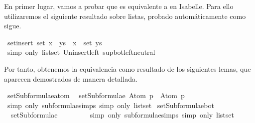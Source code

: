 \begin{isabellebody}
\begin{isamarkuptext}
  En primer lugar, vamos a probar que  es equivalente a  en
  Isabelle.
  Para ello utilizaremos el siguiente resultado sobre listas, probado automáticamente
  como sigue.%
\end{isamarkuptext}\isamarkuptrue%
\isamarkupfalse%
\ set{\isacharunderscore}insert{\isacharcolon}\ {\isachardoublequoteopen}set\ {\isacharparenleft}x\ {\isacharhash}\ ys{\isacharparenright}\ {\isacharequal}\ {\isacharbraceleft}x{\isacharbraceright}\ {\isasymunion}\ set\ ys{\isachardoublequoteclose}\isanewline
%
\isadelimproof
\ \ %
\endisadelimproof
%
\isatagproof
{}\isamarkupfalse%
\ {\isacharparenleft}simp\ only{\isacharcolon}\ list{\isachardot}set{\isacharparenleft}{}{\isacharparenright}\ Un{\isacharunderscore}insert{\isacharunderscore}left\ sup{\isacharunderscore}bot{\isachardot}left{\isacharunderscore}neutral{\isacharparenright}%
\endisatagproof
{\isafoldproof}%
%
\isadelimproof
%
\endisadelimproof
%
\begin{isamarkuptext}%
Por tanto, obtenemos la equivalencia como resultado de los siguientes lemas, que aparecen 
  demostrados de manera detallada.%
\end{isamarkuptext}\isamarkuptrue%
\isamarkupfalse%
\ setSubformulae{\isacharunderscore}atom{\isacharcolon}\isanewline
\ \ {\isachardoublequoteopen}setSubformulae\ {\isacharparenleft}Atom\ p{\isacharparenright}\ {\isacharequal}\ {\isacharbraceleft}Atom\ p{\isacharbraceright}{\isachardoublequoteclose}\isanewline
%
\isadelimproof
\ \ \ \ %
\endisadelimproof
%
\isatagproof
{}\isamarkupfalse%
\ {\isacharparenleft}simp\ only{\isacharcolon}\ subformulae{\isachardot}simps{\isacharparenleft}{}{\isacharparenright}{\isacharcomma}\ simp\ only{\isacharcolon}\ list{\isachardot}set{\isacharparenright}%
\endisatagproof
{\isafoldproof}%
%
\isadelimproof
\isanewline
%
\endisadelimproof
\isanewline
{}\isamarkupfalse%
\ setSubformulae{\isacharunderscore}bot{\isacharcolon}\isanewline
\ \ {\isachardoublequoteopen}setSubformulae\ {\isacharparenleft}{\isasymbottom}{\isacharparenright}\ {\isacharequal}\ {\isacharbraceleft}{\isasymbottom}{\isacharbraceright}{\isachardoublequoteclose}\isanewline
%
\isadelimproof
\ \ \ \ %
\endisadelimproof
%
\isatagproof
{}\isamarkupfalse%
\ {\isacharparenleft}simp\ only{\isacharcolon}\ subformulae{\isachardot}simps{\isacharparenleft}{}{\isacharparenright}{\isacharcomma}\ simp\ only{\isacharcolon}\ list{\isachardot}set{\isacharparenright}%
\endisatagproof

\end{isabellebody}
